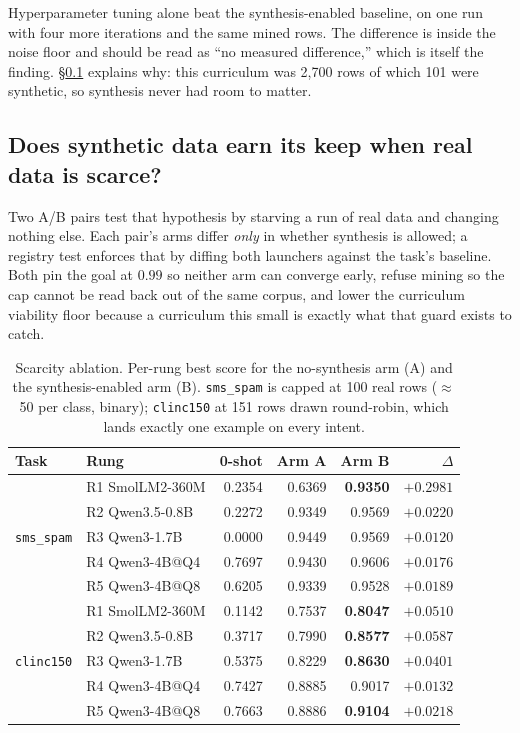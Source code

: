 \documentclass[sigconf,10pt]{acmart}
\newcommand{\xref}[1]{\S\ref{#1}}
\newcommand{\tsk}[1]{\texttt{#1}}
\begin{document}
Hyperparameter tuning alone beat the synthesis-enabled baseline, on one run with four more
iterations and the same mined rows. The difference is inside the noise floor and should be
read as ``no measured difference,'' which is itself the finding. \xref{sec:ablations-scarcity}
explains why: this curriculum was 2{,}700 rows of which 101 were synthetic, so synthesis
never had room to matter.

\subsection{Does synthetic data earn its keep when real data is scarce?}
\label{sec:ablations-scarcity}

Two A/B pairs test that hypothesis by starving a run of real data and changing nothing else.
Each pair's arms differ \emph{only} in whether synthesis is allowed; a registry test enforces
that by diffing both launchers against the task's baseline. Both pin the goal at $0.99$ so
neither arm can converge early, refuse mining so the cap cannot be read back out of the same
corpus, and lower the curriculum viability floor because a curriculum this small is exactly
what that guard exists to catch.

\begin{table}[t]
\centering
\small
\caption{Scarcity ablation. Per-rung best score for the no-synthesis arm (A) and the
synthesis-enabled arm (B). \tsk{sms\_spam} is capped at 100 real rows ($\approx$50 per class,
binary); \tsk{clinc150} at 151 rows drawn round-robin, which lands exactly one example on
every intent.}
\label{tab:scarcity}
\begin{tabular}{@{}llrrrr@{}}
\toprule
Task & Rung & 0-shot & Arm A & Arm B & $\Delta$ \\
\midrule
\multirow{5}{*}{\tsk{sms\_spam}}
& R1 SmolLM2-360M   & 0.2354 & 0.6369 & \textbf{0.9350} & $\mathbf{+0.2981}$ \\
& R2 Qwen3.5-0.8B   & 0.2272 & 0.9349 & 0.9569 & $+0.0220$ \\
& R3 Qwen3-1.7B     & 0.0000 & 0.9449 & 0.9569 & $+0.0120$ \\
& R4 Qwen3-4B@Q4    & 0.7697 & 0.9430 & 0.9606 & $+0.0176$ \\
& R5 Qwen3-4B@Q8    & 0.6205 & 0.9339 & 0.9528 & $+0.0189$ \\
\midrule
\multirow{5}{*}{\tsk{clinc150}}
& R1 SmolLM2-360M   & 0.1142 & 0.7537 & \textbf{0.8047} & $\mathbf{+0.0510}$ \\
& R2 Qwen3.5-0.8B   & 0.3717 & 0.7990 & \textbf{0.8577} & $\mathbf{+0.0587}$ \\
& R3 Qwen3-1.7B     & 0.5375 & 0.8229 & \textbf{0.8630} & $\mathbf{+0.0401}$ \\
& R4 Qwen3-4B@Q4    & 0.7427 & 0.8885 & 0.9017 & $+0.0132$ \\
& R5 Qwen3-4B@Q8    & 0.7663 & 0.8886 & \textbf{0.9104} & $\mathbf{+0.0218}$ \\
\bottomrule
\end{tabular}
\end{table}
\end{document}
